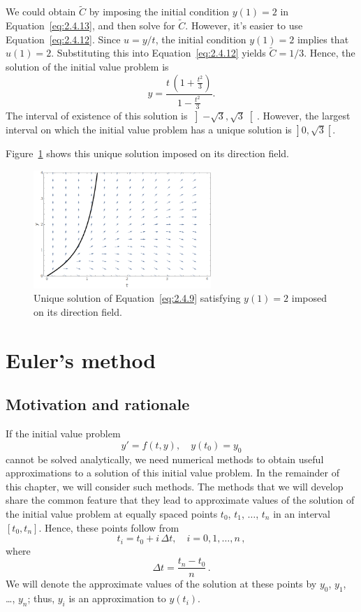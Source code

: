 \begin{example}
We could obtain $\widetilde{C}$ by imposing the initial condition $y(1)=2$ in Equation~\eqref{eq:2.4.13}, and then solve for
$\widetilde{C}$. However, it's easier to use Equation~\eqref{eq:2.4.12}. Since $u=y/t$, the initial condition $y(1)=2$ implies that $u(1)=2$.  Substituting this into Equation~\eqref{eq:2.4.12} yields $\widetilde{C}=1/3$.  Hence, the solution of the initial value problem is
$$
y=\dfrac{t\,\left(1+\frac{t^2}{3}\right)}{1-\frac{t^2}{3}}.
$$
The interval of existence of this solution is $\left]-\sqrt3,\sqrt3\right[$. However, the largest interval on which the initial value problem has a unique solution is $\left.\right]0,\sqrt3\left[\right.$.  

 Figure~\ref{ettrans2} shows this unique solution imposed on its direction field. 

\begin{figure}[H]
	\begin{center}
			\includegraphics[width=0.6\textwidth]{extrans2}
	\caption{Unique solution of Equation~\eqref{eq:2.4.9} satisfying $y(1)=2$ imposed on its direction field.}
	\label{ettrans2}
	\end{center}
\end{figure}
\end{example}

\section{Euler's method}\label{secEuler}
\subsection{Motivation and rationale}
If the initial value problem 
\begin{equation} \label{eq:3.1.1}
y'=f(t,y),\quad y(t_0)=y_0
 \end{equation}
cannot be solved analytically,  we need numerical methods to obtain useful approximations to a solution of this initial value problem. In the remainder of this chapter, we will consider such methods. The methods that we will develop share the common feature that they lead to approximate values of the solution of the initial value problem at equally spaced points $t_0$, $t_1$, $\ldots$, $t_n$ in an interval $[t_0,t_n]$.
Hence, these points follow from
$$
t_i=t_0+i\,\Delta t,\quad i=0,1, \ldots,n\,,
$$
where
$$
\Delta t=\dfrac{t_n-t_0}{n}\,.
$$
We will denote the approximate values of the solution at these points by $y_0$, $y_1$, \ldots, $y_n$;   thus, $y_i$ is an approximation to $y(t_i)$.

